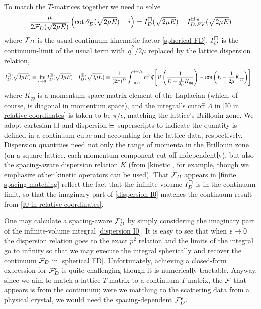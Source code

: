 To match the $T$-matrices together we need to solve
\begin{equation}
    \label{eq:finite spacing matching}
    \frac{\mu}{2 \mathcal{F}_D(\sqrt{2\mu E})}\left(\cot\delta^\epsilon_D(\sqrt{2\mu E})-i\right)
    =
    I_D^{\square}(\sqrt{2\mu E}) - I_{D,FV}^{\boxplus,\epsilon}(\sqrt{2\mu E})
\end{equation}
where $\mathcal{F}_D$ is the usual continuum kinematic factor \eqref{spherical FD}, $I_D^{\square}$ is the continuum-limit of the usual term with $\vec{q}^2/2\mu$ replaced by the lattice dispersion relation,
\begin{align}
    I_D^{\square}(\sqrt{2\mu E}) &= \lim_{\epsilon\rightarrow0}I_D^{\boxplus}(\sqrt{2\mu E})
    &
    \label{eq:dispersion I0}
    I_D^{\boxplus}(\sqrt{2 \mu E})
    &=\frac{1}{(2\pi)^D}
    \int_{-\pi/\epsilon}^{+\pi/\epsilon}
        \mathrm{d}^D \vec{q}
        \left[
            \mathcal{P} \left(
                \frac{1}{
                    E - \frac{1}{2\mu} K_{qq} }
                \right)
            -i \pi \delta\left(E - \frac{1}{2\mu}K_{qq}\right)
        \right]
\end{align}
where $K_{qq}$ is a momentum-space matrix element of the Laplacian (which, of course, is diagonal in momentum space), and the integral's cutoff $\Lambda$ in \eqref{I0 in relative coordinates} is taken to be $\pi/\epsilon$, matching the lattice's Brillouin zone.
We adopt cartesian $\square$ and dispersion $\boxplus$ superscripts to indicate the quantity is defined in a continuum cube and accounting for the lattice data, respectively.
Dispersion quantities need not only the range of momenta in the Brillouin zone (on a square lattice, each momentum component cut off independently), but also the spacing-aware dispersion relation $K$ (from \eqref{kinetic}, for example, though we emphasize other kinetic operators can be used).
That $\mathcal{F}_D$ appears in \eqref{finite spacing matching} reflect the fact that the infinite volume $I_D^{\square}$ is in the continuum limit, so that the imaginary part of \eqref{dispersion I0} matches the continuum result from \eqref{I0 in relative coordinates}.

One may calculate a spacing-aware $\mathcal{F}_D^\epsilon$ by simply considering the imaginary part of the infinite-volume integral \eqref{dispersion I0}.
It is easy to see that when $\epsilon\rightarrow0$ the dispersion relation goes to the exact $p^2$ relation and the limits of the integral go to infinity so that we may execute the integral spherically and recover the continuum $\mathcal{F}_D$ in \eqref{spherical FD}.
Unfortunately, achieving a closed-form expression for $\mathcal{F}_D^\epsilon$ is quite challenging though it is numerically tractable.
Anyway, since we aim to match a lattice $T$ matrix to a continuum $T$ matrix, the $\mathcal{F}$ that appears is from the continuum; were we matching to the scattering data from a physical crystal, we would need the spacing-dependent $\mathcal{F}_D^\epsilon$.

